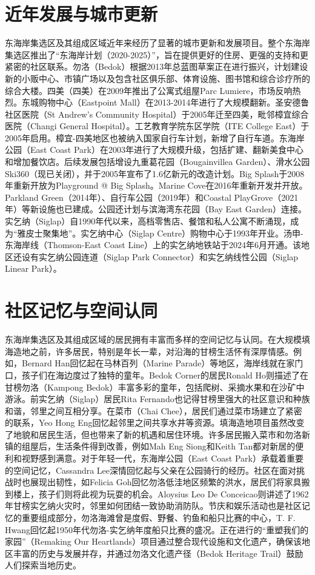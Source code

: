 \documentclass[11pt,a4paper,twoside,openany]{book}
\begin{document}
\section{近年发展与城市更新}
东海岸集选区及其组成区域近年来经历了显著的城市更新和发展项目。整个东海岸集选区推出了“东海岸计划（2020-2025）”，旨在提供更好的住房、更强的支持和更紧密的社区联系。勿洛（Bedok）根据2013年总蓝图草案正在进行振兴，计划建设新的小贩中心、市镇广场以及包含社区俱乐部、体育设施、图书馆和综合诊疗所的综合大楼。四美（四美）在2009年推出了公寓式组屋Parc Lumiere，市场反响热烈。东城购物中心（Eastpoint Mall）在2013-2014年进行了大规模翻新。圣安德鲁社区医院（St Andrew’s Community Hospital）于2005年迁至四美，毗邻樟宜综合医院（Changi General Hospital）。工艺教育学院东区学院（ITE College East）于2005年启用。樟宜-四美地区也被纳入国家自行车计划，新增了自行车道。东海岸公园（East Coast Park）在2003年进行了大规模升级，包括扩建、翻新美食中心和增加餐饮店。后续发展包括增设九重葛花园（Bougainvillea Garden）、滑水公园Ski360（现已关闭），并于2005年宣布了1.6亿新元的改造计划。Big Splash于2008年重新开放为Playground @ Big Splash。Marine Cove在2016年重新开发并开放。Parkland Green（2014年）、自行车公园（2019年）和Coastal PlayGrove（2021年）等新设施也已建成。公园还计划与滨海湾东花园（Bay East Garden）连接。实乞纳（Siglap）自1990年代以来，高档零售店、餐馆和私人公寓不断涌现，成为“雅皮士聚集地”。实乞纳中心（Siglap Centre）购物中心于1993年开业。汤申-东海岸线（Thomson-East Coast Line）上的实乞纳地铁站于2024年6月开通。该地区还设有实乞纳公园连道（Siglap Park Connector）和实乞纳线性公园（Siglap Linear Park）。

\section{社区记忆与空间认同}
东海岸集选区及其组成区域的居民拥有丰富而多样的空间记忆与认同。在大规模填海造地之前，许多居民，特别是年长一辈，对沿海的甘榜生活怀有深厚情感。例如，Bernard Han回忆起在马林百列（Marine Parade）等地区，海岸线就在家门口，孩子们在海边度过了独特的童年。Bedok Corner的居民Ronald Ho则描述了在甘榜勿洛（Kampong Bedok）丰富多彩的童年，包括爬树、采摘水果和在沙矿中游泳。前实乞纳（Siglap）居民Rita Fernando也记得甘榜里强大的社区意识和种族和谐，邻里之间互相分享。在菜市（Chai Chee），居民们通过菜市场建立了紧密的联系，Yeo Hong Eng回忆起邻里之间共享水井等资源。填海造地项目虽然改变了地貌和居民生活，但也带来了新的机遇和居住环境。许多居民搬入菜市和勿洛新镇的组屋后，生活条件得到改善，例如Mah Eng Siong和Keith Tan都对新居的便利和视野感到满意。对于年轻一代，东海岸公园（East Coast Park）承载着重要的空间记忆，Cassandra Lee深情回忆起与父亲在公园骑行的经历。社区在面对挑战时也展现出韧性，如Felicia Goh回忆勿洛低洼地区频繁的洪水，居民们将家具搬到楼上，孩子们则将此视为玩耍的机会。Aloysius Leo De Conceicao则讲述了1962年甘榜实乞纳火灾时，邻里如何团结一致协助消防队。节庆和娱乐活动也是社区记忆的重要组成部分，勿洛海滩曾是度假、野餐、钓鱼和船只比赛的中心，T. F. Hwang回忆起1950年代勿洛-实乞纳年度船只比赛的盛况。正在进行的“重塑我们的家园”（Remaking Our Heartlands）项目通过整合现代设施和文化遗产，确保该地区丰富的历史与发展并存，并通过勿洛文化遗产径（Bedok Heritage Trail）鼓励人们探索当地历史。
\end{document}
